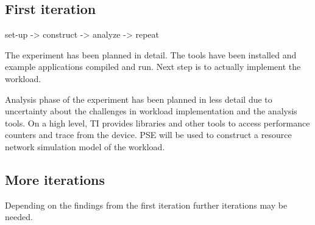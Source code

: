 \subsection{First iteration}
set-up -> construct -> analyze -> repeat

The experiment has been planned in detail. The tools have been installed and example applications compiled and run. Next step is to actually implement the workload.

Analysis phase of the experiment has been planned in less detail due to uncertainty about the challenges in workload implementation and the analysis tools. On a high level, TI provides libraries and other tools to access performance counters and trace from the device. PSE will be used to construct a resource network simulation model of the workload.

\subsection{More iterations}
Depending on the findings from the first iteration further iterations may be needed.